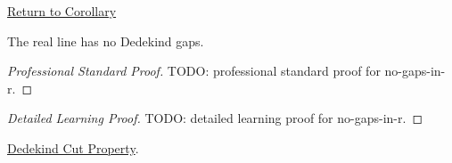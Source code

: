 \newpage
{}
\label{prf:no-gaps-in-r}

\begin{remark*}[Return]
\hyperref[cor:no-gaps-in-r]{Return to Corollary}
\end{remark*}

\begin{corollary*}
The real line has no Dedekind gaps.
\end{corollary*}

\begin{proof}[Professional Standard Proof]
\LRAProofBodyStart
TODO: professional standard proof for no-gaps-in-r.
\end{proof}

\begin{proof}[Detailed Learning Proof]
\LRAProofBodyStart
TODO: detailed learning proof for no-gaps-in-r.
\end{proof}

\begin{remark*}
\end{remark*}

\begin{dependencies}
\hyperref[thm:dedekind-cut-property]{Dedekind Cut Property}.
\end{dependencies}

\clearpage
